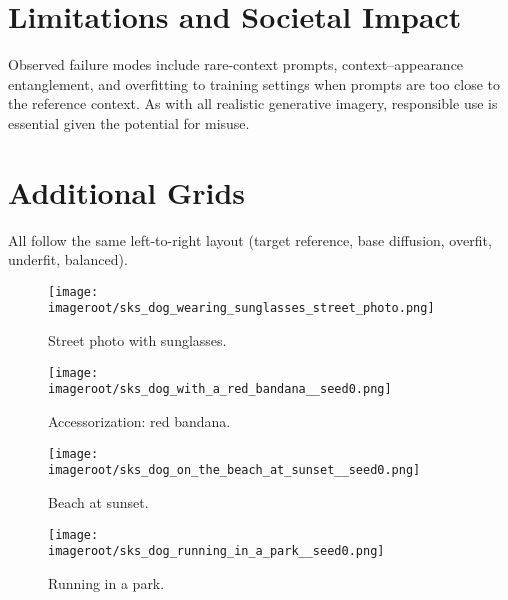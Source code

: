 \documentclass[11pt]{article}
\newcommand{\imageroot}{artifacts/grids_with_ref}
\begin{document}
\section{Limitations and Societal Impact}
Observed failure modes include rare-context prompts, context--appearance entanglement, and overfitting to training settings when prompts are too close to the reference context. As with all realistic generative imagery, responsible use is essential given the potential for misuse.

\appendix
\section{Additional Grids}
All follow the same left-to-right layout (target reference, base diffusion, overfit, underfit, balanced).


\begin{figure}[h]
  \centering
  \texttt{[image: \\imageroot/sks\_dog\_wearing\_sunglasses\_street\_photo.png]}
  \caption{Street photo with sunglasses.}
\end{figure}

\begin{figure}[h]
  \centering
  \texttt{[image: \\imageroot/sks\_dog\_with\_a\_red\_bandana\_\_seed0.png]}
  \caption{Accessorization: red bandana.}
\end{figure}

\begin{figure}[h]
  \centering
  \texttt{[image: \\imageroot/sks\_dog\_on\_the\_beach\_at\_sunset\_\_seed0.png]}
  \caption{Beach at sunset.}
\end{figure}

\begin{figure}[h]
  \centering
  \texttt{[image: \\imageroot/sks\_dog\_running\_in\_a\_park\_\_seed0.png]}
  \caption{Running in a park.}
  \label{fig:running_in_a_park}
\end{figure}
\end{document}
